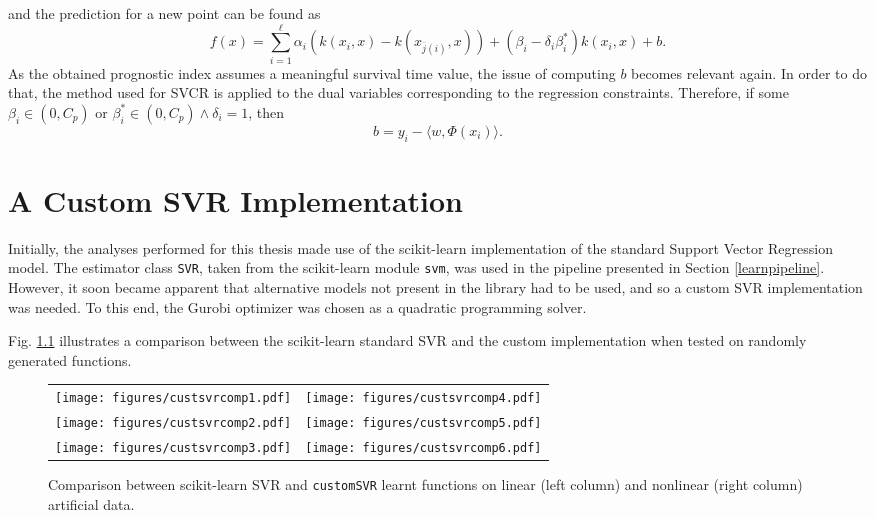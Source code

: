 \documentclass[12pt]{report}
\begin{document}
and the prediction for a new point can be found as
\begin{equation} \label{model2f}
f(x) = \sum_{i=1}^{\ell}\alpha_{i}(k(x_{i},x) - k(x_{\overline{j}(i)},x))+(\beta_{i}-\delta_{i}\beta_{i}^{*})k(x_{i},x)+b \text{.}
\end{equation}
As the obtained prognostic index assumes a meaningful survival time value, the issue of computing $b$ becomes relevant again. In order to do that, the method used for SVCR is applied to the dual variables corresponding to the regression constraints. Therefore, if some $\beta_{i} \in (0,C_{p})$ or $\beta_{i}^{*} \in (0,C_{p}) \wedge \delta_{i} = 1$, then
\begin{equation} \label{model2b3}
b = y_{i} - \langle w,\Phi(x_{i})\rangle \text{.}
\end{equation}

\chapter{A Custom SVR Implementation}
\label{chcustsvr}
Initially, the analyses performed for this thesis made use of the scikit-learn \cite{sklearn} implementation of the standard Support Vector Regression model. The estimator class \texttt{SVR}, taken from the scikit-learn module \texttt{svm}, was used in the pipeline presented in Section \ref{learnpipeline}. However, it soon became apparent that alternative models not present in the library had to be used, and so a custom SVR implementation was needed. To this end, the Gurobi optimizer \cite{gurobi} was chosen as a quadratic programming solver.

Fig. \ref{custsvrfig} illustrates a comparison between the scikit-learn standard SVR and the custom implementation when tested on randomly generated functions.

\begin{figure}[hp]
	\begin{adjustwidth}{-1in}{-1in}
  	\centering
  	\begin{tabular}{cc}
  		\texttt{[image: figures/custsvrcomp1.pdf]} & 
  		\texttt{[image: figures/custsvrcomp4.pdf]} \\
		\texttt{[image: figures/custsvrcomp2.pdf]} &
		\texttt{[image: figures/custsvrcomp5.pdf]} \\
		\texttt{[image: figures/custsvrcomp3.pdf]} &
		\texttt{[image: figures/custsvrcomp6.pdf]} \\
  	\end{tabular}
  	\end{adjustwidth}
  	\caption{Comparison between scikit-learn SVR and \texttt{customSVR} learnt functions on linear (left column) and nonlinear (right column) artificial data.}
  	\label{custsvrfig}
\end{figure}
\end{document}
